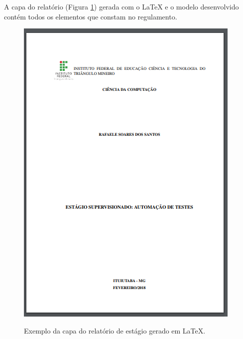 \newpage
A capa do relatório (Figura \ref{capaest}) gerada com o LaTeX e o modelo desenvolvido contém todos os elementos que constam no regulamento.\\

\begin{figure}[h]
	\centering
	\includegraphics{imagens/relatorioEstagio/Capa.png}\\
	\caption{Exemplo da capa do relatório de estágio gerado em LaTeX.}
	\label{capaest}
\end{figure}

